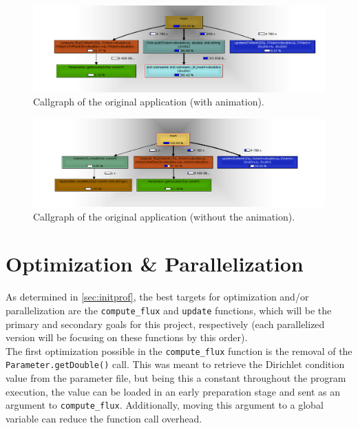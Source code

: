 \documentclass[9pt,twocolumn]{scrartcl}
\begin{document}
\begin{figure}[!htp]
	\begin{center}
		\includegraphics[width=\textwidth]{images/output.png}
	\end{center}
	\caption{Callgraph of the original application (with animation).}
	\label{fig:callgraph.orig.anim}
\end{figure}

\begin{figure}[!htp]
	\begin{center}
		\includegraphics[width=\textwidth]{images/no_output.png}
	\end{center}
	\caption{Callgraph of the original application (without the animation).}
	\label{fig:callgraph.orig.still}
\end{figure}


\section{Optimization \& Parallelization}
\label{sec:optm&para}
As determined in \autoref{sec:initprof}, the best targets for optimization and/or parallelization are the \texttt{compute\_flux} and \texttt{update} functions, which will be the primary and secondary goals for this project, respectively (each parallelized version will be focusing on these functions by this order).\\

The first optimization possible in the \texttt{compute\_flux} function is the removal of the \texttt{Parameter.getDouble()} call. This was meant to retrieve the Dirichlet condition value from the parameter file, but being this a constant throughout the program execution, the value can be loaded in an early preparation stage and sent as an argument to \texttt{compute\_flux}. Additionally, moving this argument to a global variable can reduce the function call overhead.\\
\end{document}
